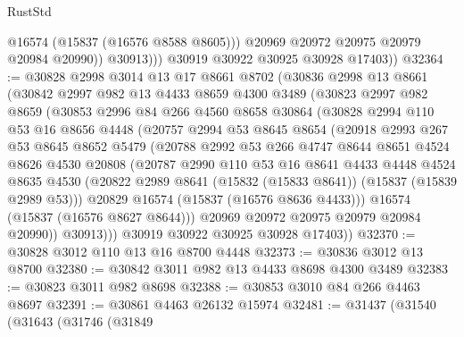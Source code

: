 \begin{lexlean}{RustStd}
\begin{coremodule}
{\begin{coremodule}
{{{{{{{{{{{{{{{{{{{{{{{{{{{{{{{{{{{{{{{{{{{{{{{{{{{{{{{{{{{{                    @16574
                    (@15837 (@16576 @8588 @8605)))
                  @20969
                  @20972
                  @20975
                  @20979
                  @20984
                  @20990))
              @30913)))
        @30919
        @30922
        @30925
        @30928
        @17403))
@32364 := @30828
    @2998
    @3014
    @13
    @17
    @8661
    @8702
    (@30836
      @2998
      @13
      @8661
      (@30842
        @2997
        @982
        @13
        @4433
        @8659
        @4300
        @3489
        (@30823
          @2997
          @982
          @8659
          (@30853
            @2996
            @84
            @266
            @4560
            @8658
            @30864
            (@30828
              @2994
              @110
              @53
              @16
              @8656
              @4448
              (@20757
                @2994
                @53
                @8645
                @8654
                (@20918
                  @2993
                  @267
                  @53
                  @8645
                  @8652
                  @5479
                  (@20788
                    @2992
                    @53
                    @266
                    @4747
                    @8644
                    @8651
                    @4524
                    @8626
                    @4530
                    @20808
                    (@20787
                      @2990
                      @110
                      @53
                      @16
                      @8641
                      @4433
                      @4448
                      @4524
                      @8635
                      @4530
                      (@20822 @2989 @8641 (@15832 (@15833 @8641)) (@15837 (@15839 @2989 @53)))
                      @20829
                      @16574
                      (@15837 (@16576 @8636 @4433)))
                    @16574
                    (@15837 (@16576 @8627 @8644)))
                  @20969
                  @20972
                  @20975
                  @20979
                  @20984
                  @20990))
              @30913)))
        @30919
        @30922
        @30925
        @30928
        @17403))
@32370 := @30828 @3012 @110 @13 @16 @8700 @4448
@32373 := @30836 @3012 @13 @8700
@32380 := @30842 @3011 @982 @13 @4433 @8698 @4300 @3489
@32383 := @30823 @3011 @982 @8698
@32388 := @30853 @3010 @84 @266 @4463 @8697
@32391 := @30861 @4463 @26132 @15974
@32481 := @31437
    (@31540
      (@31643
        (@31746
          (@31849
}}}}}}}}}}}}}}}}}}}}}}}}}}}}}}}}}}}}}}}}}}}}}}}}}}}}}}}}}}}}
\end{coremodule}}
\end{coremodule}
\end{lexlean}
